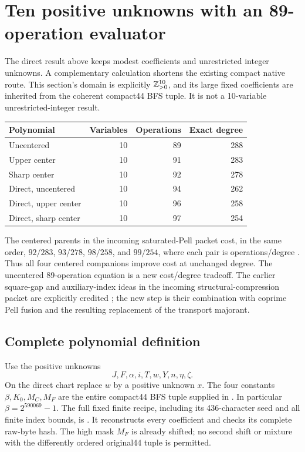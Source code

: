 \section{Ten positive unknowns with an 89-operation evaluator}
\label{sec:positive}

The direct result above keeps modest coefficients and unrestricted integer
unknowns. A complementary calculation shortens the existing compact native
route. This section's domain is explicitly $\mathbb Z_{>0}^{10}$, and its large
fixed coefficients are inherited from the coherent compact44 BFS tuple.
It is not a 10-variable unrestricted-integer result.

\begin{center}
\begin{tabular}{lrrr}
\toprule
Polynomial & Variables & Operations & Exact degree\\
\midrule
Uncentered & 10 & 89 & 288\\
Upper center & 10 & 91 & 283\\
Sharp center & 10 & 92 & 278\\
Direct, uncentered & 10 & 94 & 262\\
Direct, upper center & 10 & 96 & 258\\
Direct, sharp center & 10 & 97 & 254\\
\bottomrule
\end{tabular}
\end{center}

The centered parents in the incoming saturated-Pell packet cost, in the
same order, $92/283$, $93/278$, $98/258$, and $99/254$, where each pair is
operations/degree \cite{saturated}. Thus all four centered companions
improve cost at unchanged degree. The uncentered 89-operation equation is
a new cost/degree tradeoff. The earlier square-gap and auxiliary-index
ideas in the incoming structural-compression packet are explicitly credited
\cite{structural}; the new step is their combination with coprime Pell
fusion and the resulting replacement of the transport majorant.

\subsection{Complete polynomial definition}
Use the positive unknowns
\[
 J,F,\alpha,i,T,w,Y,n,\eta,\zeta.
\]
On the direct chart replace $w$ by a positive unknown $x$. The four
constants $\beta,K_0,M_C,M_F$ are the entire compact44 BFS tuple supplied
in . In particular $\beta=2^{590069}-1$.
The full fixed finite recipe, including its 436-character seed and all
finite index bounds, is .
It reconstructs every coefficient and checks its complete raw-byte hash.
The high mask $M_F$ is already shifted; no second shift or mixture with
the differently ordered original44 tuple is permitted.

